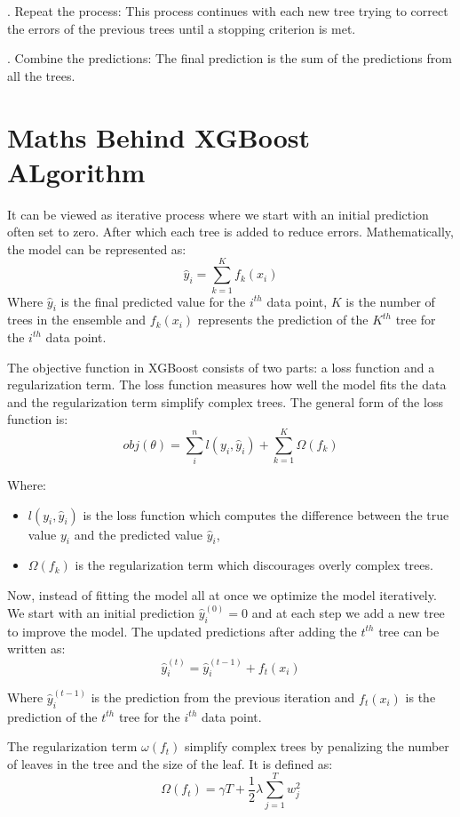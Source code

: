 \documentclass{article}
\begin{document}
\smallskip
{}. Repeat the process: This process continues with each new 
tree trying to correct the errors of the previous trees until 
a stopping criterion is met.

\smallskip
{}. Combine the predictions: The final prediction is the sum of 
the predictions from all the trees.

\section{Maths Behind XGBoost ALgorithm}
It can be viewed as iterative process where we start with an 
initial prediction often set to zero. After which each tree is 
added to reduce errors. Mathematically, the model can be 
represented as:$$\hat{y}_i = \sum_{k=1}^{K} f_k(x_i)$$
\noindent
Where $\hat{y}_i$ is the final predicted value for the $i^{th}$ 
data point, $K$ is the number of trees in the ensemble and 
$f_k(x_i)$ represents the prediction of the $K^{th}$ tree for the 
$i^{th}$ data point.

\smallskip
\noindent
The objective function in XGBoost consists of two parts: a loss 
function and a regularization term. The loss function measures 
how well the model fits the data and the regularization term 
simplify complex trees. The general form of the loss function 
is:
$$obj(\theta) = \sum_{i}^{n} l(y_i, \hat{y}_i) + \sum_{k=1}^{K} \Omega(f_k)$$

\smallskip
\noindent
Where:
\begin{itemize}
    \item $l(y_i, \hat{y}_i)$ is the loss function which 
    computes the difference between the true value $y_i$ and 
    the predicted value $\hat{y}_i$,
    \item $\Omega(f_k)$ is the regularization term which 
    discourages overly complex trees.
\end{itemize}

\smallskip
\noindent
Now, instead of fitting the model all at once we optimize the 
model iteratively. We start with an initial prediction 
$\hat{y}_i^{(0)} = 0$
and at each step we add a new tree to improve the model. The 
updated predictions after adding the $t^{th}$ tree can be 
written as:
$$\hat{y}_i^{(t)} = \hat{y}_i^{(t-1)} + f_t(x_i)$$

\smallskip
\noindent
Where $\hat{y}_i^{(t-1)}$ is the prediction from the previous 
iteration and $f_t(x_i)$ is the prediction of the $t^{th}$ tree 
for the $i^{th}$ data point.

\smallskip
\noindent
The regularization term $\omega(f_t)$ simplify complex trees by 
penalizing the number of leaves in the tree and the size of the 
leaf. It is defined as:
$$\Omega(f_t) = \gamma T + \frac{1}{2} \lambda \sum_{j=1}^{T} w_j^2$$
\end{document}
